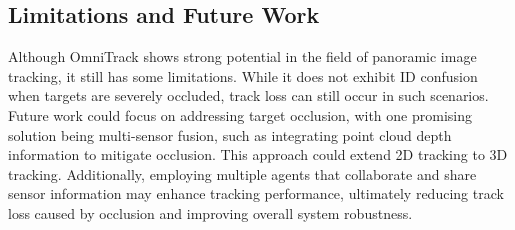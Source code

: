 \subsection{Limitations and Future Work}
Although OmniTrack shows strong potential in the field of panoramic image tracking, it still has some limitations. 
While it does not exhibit ID confusion when targets are severely occluded, track loss can still occur in such scenarios. 
Future work could focus on addressing target occlusion, with one promising solution being multi-sensor fusion, such as integrating point cloud depth information to mitigate occlusion. 
This approach could extend 2D tracking to 3D tracking. Additionally, employing multiple agents that collaborate and share sensor information may enhance tracking performance,  ultimately reducing track loss caused by occlusion and improving overall system robustness.

%
